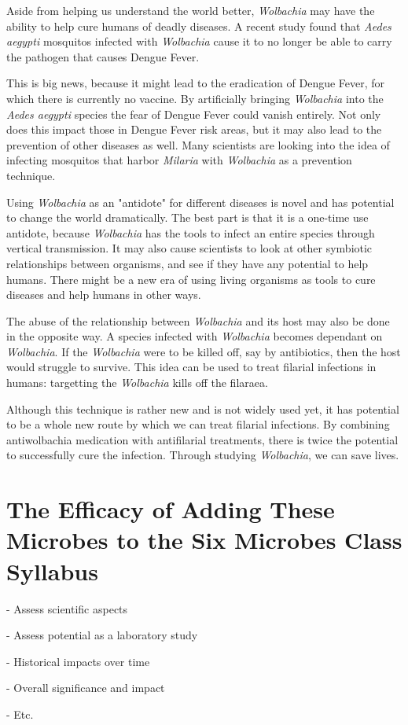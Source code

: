 \documentclass[twocolumn]{article}
\begin{document}
Aside from helping us understand the world better, \textit{Wolbachia} may have the ability to help cure humans of deadly diseases. A recent study found that \textit{Aedes aegypti} mosquitos infected with \textit{Wolbachia} cause it to no longer be able to carry the pathogen that causes Dengue Fever.\cite{Wdengue_fever}

This is big news, because it might lead to the eradication of Dengue Fever, for which there is currently no vaccine. By artificially bringing \textit{Wolbachia} into the \textit{Aedes aegypti} species the fear of Dengue Fever could vanish entirely. Not only does this impact those in Dengue Fever risk areas, but it may also lead to the prevention of other diseases as well. Many scientists are looking into the idea of infecting mosquitos that harbor \textit{Milaria} with \textit{Wolbachia} as a prevention technique.\cite{Wmilaria}

Using \textit{Wolbachia} as an "antidote" for different diseases is novel and has potential to change the world dramatically. The best part is that it is a one-time use antidote, because \textit{Wolbachia} has the tools to infect an entire species through vertical transmission. It may also cause scientists to look at other symbiotic relationships between organisms, and see if they have any potential to help humans. There might be a new era of using living organisms as tools to cure diseases and help humans in other ways.

The abuse of the relationship between \textit{Wolbachia} and its host may also be done in the opposite way. A species infected with \textit{Wolbachia} becomes dependant on \textit{Wolbachia}. If the \textit{Wolbachia} were to be killed off, say by antibiotics, then the host would struggle to survive. This idea can be used to treat filarial infections in humans: targetting the \textit{Wolbachia} kills off the filaraea.\cite{wolbachia}\cite{Wcure_filarial_infection}

Although this technique is rather new and is not widely used yet, it has potential to be a whole new route by which we can treat filarial infections. By combining antiwolbachia medication with antifilarial treatments, there is twice the potential to successfully cure the infection. Through studying \textit{Wolbachia}, we can save lives.


\section*{The Efficacy of Adding These Microbes to the Six Microbes Class Syllabus}

- Assess scientific aspects

- Assess potential as a laboratory study

- Historical impacts over time
	
- Overall significance and impact

- Etc.


\printbibliography
\end{document}

